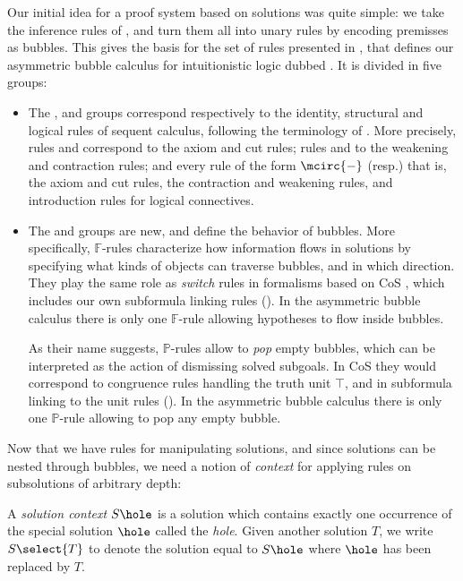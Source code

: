 Our initial idea for a proof system based on solutions was quite simple: we take
the inference rules of , and turn them all into unary rules by encoding
premisses as bubbles. This gives the basis for the set of rules presented in
, that defines our asymmetric bubble
calculus for intuitionistic logic dubbed . It is divided in five groups:
\begin{itemize}
  \item The {\identity}, {\resource} and {\heating} groups correspond
  respectively to the identity, structural and logical rules of sequent
  calculus, following the terminology of . More
  precisely, rules {} and {} correspond
  to the axiom and cut rules; rules {} and {} to the weakening
  and contraction rules; and every rule of the form $\mcirc{-}$ (resp.) that
  is, the axiom and cut rules, the contraction and weakening rules, and
  introduction rules for logical connectives.
  \item The {\flow} and {\popping} groups are new, and define the behavior of
  bubbles. More specifically, $\mathbb{F}$-rules characterize how information
  flows in solutions by specifying what kinds of objects can traverse bubbles,
  and in which direction. They play the same role as \emph{switch} rules in
  formalisms based on CoS \cite{Guglielmi1999ACO}, which includes our own
  subformula linking rules (). In the asymmetric bubble calculus
  there is only one $\mathbb{F}$-rule {} allowing hypotheses to flow
  inside bubbles.
  
  As their name suggests, $\mathbb{P}$-rules allow to \emph{pop} empty bubbles,
  which can be interpreted as the action of dismissing solved subgoals. In CoS
  they would correspond to congruence rules handling the truth unit $\top$, and
  in subformula linking to the unit rules (). In the asymmetric
  bubble calculus there is only one $\mathbb{P}$-rule {} allowing to
  pop any empty bubble.
\end{itemize}

Now that we have rules for manipulating solutions, and since solutions can be
nested through bubbles, we need a notion of \emph{context} for applying rules on
subsolutions of arbitrary depth:

\begin{definition}
  A \emph{solution context} $S\hole$ is a solution which contains exactly one
  occurrence of the special solution $\hole$ called the \emph{hole}. Given
  another solution $T$, we write $S\select{T}$ to denote the solution equal to
  $S\hole$ where $\hole$ has been replaced by $T$.
\end{definition}

